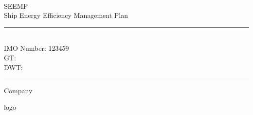 
\newcommand{\HRule}{\textcolor{greenheavy}{\rule{0.5\linewidth}{0.25mm}}}

\pagestyle{empty}

\begin{titlepage}
~\\
\vspace{4cm}
\begin{center}
\textcolor{greenheavy}{
\Huge{
SEEMP %
}\\
Ship Energy Efficiency Management Plan
}

\vspace{4cm}
\HRule
\textcolor{greenheavy}{
\LARGE{
\\
IMO Number: 123459%
\\
GT: %
\\
DWT: %
\\
}
}
\HRule
\end{center}
\vfill
\noindent
\begin{minipage}{0.4\textwidth}
\begin{flushleft}
\large{
Company
}
\end{flushleft}
\end{minipage}
\begin{minipage}{0.5\textwidth}
\begin{flushright}
\large{
logo
}
\end{flushright}
\end{minipage}
\end{titlepage}

\newpage